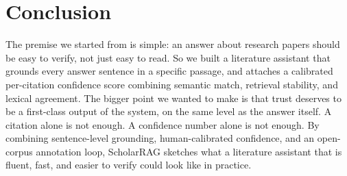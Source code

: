 \documentclass[10pt]{article}
\begin{document}
\section{Conclusion}
\label{sec:conclusion}

The premise we started from is simple: an answer about research
papers should be easy to verify, not just easy to read. So we built
a literature assistant that grounds every answer sentence in a
specific passage, and attaches a calibrated per-citation confidence
score combining semantic match, retrieval stability, and lexical
agreement. The bigger point we wanted to make is that trust deserves
to be a first-class output of the system, on the same level as the
answer itself. A citation alone is not enough. A confidence number
alone is not enough. By combining sentence-level grounding,
human-calibrated confidence, and an open-corpus annotation loop,
ScholarRAG sketches what a literature assistant that is fluent,
fast, and easier to verify could look like in practice.



\end{document}
